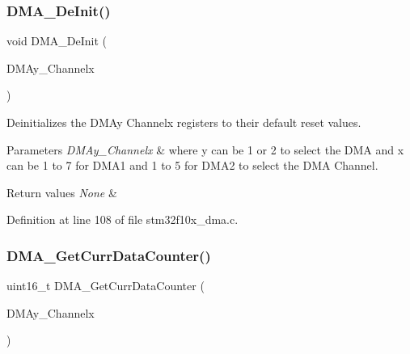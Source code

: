 \subsubsection{\texorpdfstring{D\+M\+A\+\_\+\+De\+Init()}{DMA\_DeInit()}}
{\footnotesize\ttfamily void D\+M\+A\+\_\+\+De\+Init (\begin{DoxyParamCaption}\item[{\hyperlink{struct_d_m_a___channel___type_def}{D\+M\+A\+\_\+\+Channel\+\_\+\+Type\+Def} $\ast$}]{D\+M\+Ay\+\_\+\+Channelx }\end{DoxyParamCaption})}



Deinitializes the D\+M\+Ay Channelx registers to their default reset values. 


\begin{DoxyParams}{Parameters}
{\em D\+M\+Ay\+\_\+\+Channelx} & where y can be 1 or 2 to select the D\+MA and x can be 1 to 7 for D\+M\+A1 and 1 to 5 for D\+M\+A2 to select the D\+MA Channel. \\
\hline
\end{DoxyParams}

\begin{DoxyRetVals}{Return values}
{\em None} & \\
\hline
\end{DoxyRetVals}


Definition at line 108 of file stm32f10x\+\_\+dma.\+c.

\mbox{\label{group___d_m_a___exported___functions_ga511b4c402d1ff32d53f28736956cac5d}} 
\subsubsection{\texorpdfstring{D\+M\+A\+\_\+\+Get\+Curr\+Data\+Counter()}{DMA\_GetCurrDataCounter()}}
{\footnotesize\ttfamily uint16\+\_\+t D\+M\+A\+\_\+\+Get\+Curr\+Data\+Counter (\begin{DoxyParamCaption}\item[{\hyperlink{struct_d_m_a___channel___type_def}{D\+M\+A\+\_\+\+Channel\+\_\+\+Type\+Def} $\ast$}]{D\+M\+Ay\+\_\+\+Channelx }\end{DoxyParamCaption})}



